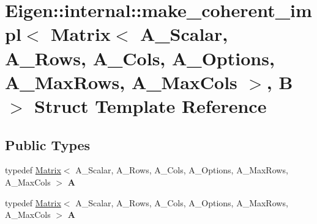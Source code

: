 \hypertarget{struct_eigen_1_1internal_1_1make__coherent__impl_3_01_matrix_3_01_a___scalar_00_01_a___rows_00_0aa8f55819fa60ac5751cc2cbbaa58000}{}\section{Eigen\+:\+:internal\+:\+:make\+\_\+coherent\+\_\+impl$<$ Matrix$<$ A\+\_\+\+Scalar, A\+\_\+\+Rows, A\+\_\+\+Cols, A\+\_\+\+Options, A\+\_\+\+Max\+Rows, A\+\_\+\+Max\+Cols $>$, B $>$ Struct Template Reference}
\label{struct_eigen_1_1internal_1_1make__coherent__impl_3_01_matrix_3_01_a___scalar_00_01_a___rows_00_0aa8f55819fa60ac5751cc2cbbaa58000}
\subsection*{Public Types}
\begin{DoxyCompactItemize}
\item 
\mbox{\label{struct_eigen_1_1internal_1_1make__coherent__impl_3_01_matrix_3_01_a___scalar_00_01_a___rows_00_0aa8f55819fa60ac5751cc2cbbaa58000_a2a0c708aafc868168231316712d384f2}} 
typedef \hyperlink{group___core___module_class_eigen_1_1_matrix}{Matrix}$<$ A\+\_\+\+Scalar, A\+\_\+\+Rows, A\+\_\+\+Cols, A\+\_\+\+Options, A\+\_\+\+Max\+Rows, A\+\_\+\+Max\+Cols $>$ {\bfseries A}
\item 
\mbox{\label{struct_eigen_1_1internal_1_1make__coherent__impl_3_01_matrix_3_01_a___scalar_00_01_a___rows_00_0aa8f55819fa60ac5751cc2cbbaa58000_a2a0c708aafc868168231316712d384f2}} 
typedef \hyperlink{group___core___module_class_eigen_1_1_matrix}{Matrix}$<$ A\+\_\+\+Scalar, A\+\_\+\+Rows, A\+\_\+\+Cols, A\+\_\+\+Options, A\+\_\+\+Max\+Rows, A\+\_\+\+Max\+Cols $>$ {\bfseries A}
\end{DoxyCompactItemize}
